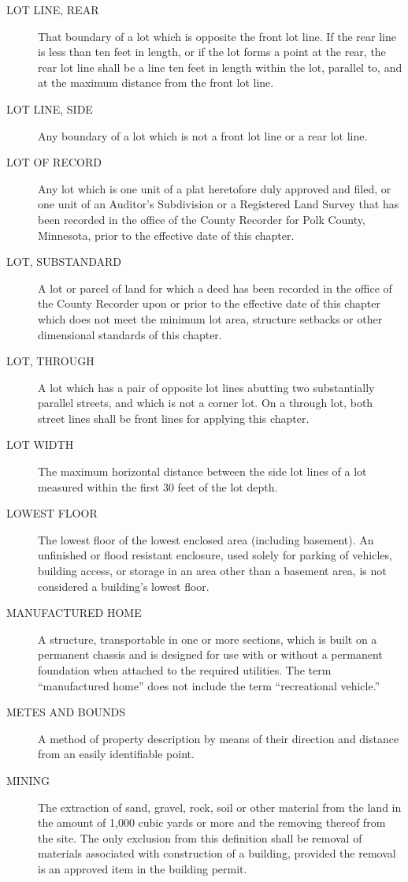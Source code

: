 \begin{description}
    \item[LOT LINE, REAR] That boundary of a lot which is opposite the front lot line.  If the rear line is less than ten feet in length, or if the lot forms a point at the rear, the rear lot line shall be a line ten feet in length within the lot, parallel to, and at the maximum distance from the front lot line.
    \item[LOT LINE, SIDE] Any boundary of a lot which is not a front lot line or a rear lot line.
    \item[LOT OF RECORD] Any lot which is one unit of a plat heretofore duly approved and filed, or one unit of an Auditor’s Subdivision or a Registered Land Survey that has been recorded in the office of the County Recorder for Polk County, Minnesota, prior to the effective date of this chapter.
    \item[LOT, SUBSTANDARD] A lot or parcel of land for which a deed has been recorded in the office of the County Recorder upon or prior to the effective date of this chapter which does not meet the minimum lot area, structure setbacks or other dimensional standards of this chapter.
    \item[LOT, THROUGH] A lot which has a pair of opposite lot lines abutting two substantially parallel streets, and which is not a corner lot. On a through lot, both street lines shall be front lines for applying this chapter.
    \item[LOT WIDTH] The maximum horizontal distance between the side lot lines of a lot measured within the first 30 feet of the lot depth.
    \item[LOWEST FLOOR] The lowest floor of the lowest enclosed area (including basement). An unfinished or flood resistant enclosure, used solely for parking of vehicles, building access, or storage in an area other than a basement area, is not considered a building’s lowest floor.
    \item[MANUFACTURED HOME] A structure, transportable in one or more sections, which is built on a permanent chassis and is designed for use with or without a permanent foundation when attached to the required utilities. The term “manufactured home” does not include the term “recreational vehicle.”
    \item[METES AND BOUNDS] A method of property description by means of their direction and distance from an easily identifiable point.
    \item[MINING] The extraction of sand, gravel, rock, soil or other material from the land in the amount of 1,000 cubic yards or more and the removing thereof from the site.  The only exclusion from this definition shall be removal of materials associated with construction of a building, provided the removal is an approved item in the building permit.

\end{description}
